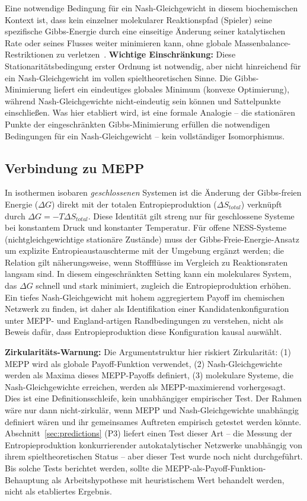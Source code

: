\documentclass[12pt,a4paper]{article}
\theoremstyle{remark}
\begin{document}
Eine notwendige Bedingung für ein Nash-Gleichgewicht in diesem biochemischen Kontext ist, dass kein einzelner molekularer Reaktionspfad (Spieler) seine spezifische Gibbs-Energie durch eine einseitige Änderung seiner katalytischen Rate oder seines Flusses weiter minimieren kann, ohne globale Massenbalance-Restriktionen zu verletzen~\citep{MetabolicNash}. \textbf{Wichtige Einschränkung:} Diese Stationaritätsbedingung erster Ordnung ist notwendig, aber nicht hinreichend für ein Nash-Gleichgewicht im vollen spieltheoretischen Sinne. Die Gibbs-Minimierung liefert ein eindeutiges globales Minimum (konvexe Optimierung), während Nash-Gleichgewichte nicht-eindeutig sein können und Sattelpunkte einschließen. Was hier etabliert wird, ist eine formale Analogie -- die stationären Punkte der eingeschränkten Gibbs-Minimierung erfüllen die notwendigen Bedingungen für ein Nash-Gleichgewicht -- kein vollständiger Isomorphismus.

\subsection{Verbindung zu MEPP}

In isothermen isobaren \emph{geschlossenen} Systemen ist die Änderung der Gibbs-freien Energie ($\Delta G$) direkt mit der totalen Entropieproduktion ($\Delta S_{total}$) verknüpft durch $\Delta G = -T\Delta S_{total}$. Diese Identität gilt streng nur für geschlossene Systeme bei konstantem Druck und konstanter Temperatur. Für offene NESS-Systeme (nichtgleichgewichtige stationäre Zustände) muss der Gibbs-Freie-Energie-Ansatz um explizite Entropieaustauschterme mit der Umgebung ergänzt werden; die Relation gilt näherungsweise, wenn Stoffflüsse im Vergleich zu Reaktionsraten langsam sind. In diesem eingeschränkten Setting kann ein molekulares System, das $\Delta G$ schnell und stark minimiert, zugleich die Entropieproduktion erhöhen. Ein tiefes Nash-Gleichgewicht mit hohem aggregiertem Payoff im chemischen Netzwerk zu finden, ist daher als Identifikation einer Kandidatenkonfiguration unter MEPP- und England-artigen Randbedingungen zu verstehen, nicht als Beweis dafür, dass Entropieproduktion diese Konfiguration kausal auswählt.

\textbf{Zirkularitäts-Warnung:} Die Argumentstruktur hier riskiert Zirkularität: (1) MEPP wird als globale Payoff-Funktion verwendet, (2) Nash-Gleichgewichte werden als Maxima dieses MEPP-Payoffs definiert, (3) molekulare Systeme, die Nash-Gleichgewichte erreichen, werden als MEPP-maximierend vorhergesagt. Dies ist eine Definitionsschleife, kein unabhängiger empirischer Test. Der Rahmen wäre nur dann nicht-zirkulär, wenn MEPP und Nash-Gleichgewichte unabhängig definiert wären und ihr gemeinsames Auftreten empirisch getestet werden könnte. Abschnitt~\ref{sec:predictions} (P3) liefert einen Test dieser Art -- die Messung der Entropieproduktion konkurrierender autokatalytischer Netzwerke unabhängig von ihrem spieltheoretischen Status -- aber dieser Test wurde noch nicht durchgeführt. Bis solche Tests berichtet werden, sollte die MEPP-als-Payoff-Funktion-Behauptung als Arbeitshypothese mit heuristischem Wert behandelt werden, nicht als etabliertes Ergebnis.
\end{document}
